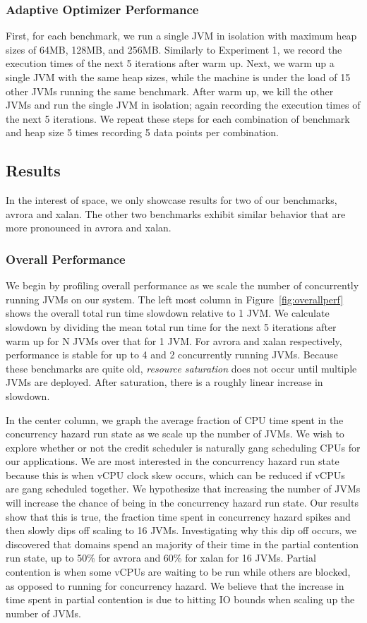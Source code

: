 \documentclass{sig-alternate}
\begin{document}
\subsubsection{Adaptive Optimizer Performance}
First, for each benchmark, we run a single JVM in isolation with maximum heap sizes of 64MB, 128MB, and 256MB. Similarly to Experiment 1, we record the execution times of the next 5 iterations after warm up. Next, we warm up a single JVM with the same heap sizes, while the machine is under the load of 15 other JVMs running the same benchmark. After warm up, we kill the other JVMs and run the single JVM in isolation; again recording the execution times of the next 5 iterations. We repeat these steps for each combination of benchmark and heap size 5 times recording 5 data points per combination.

\subsection{Results}
In the interest of space, we only showcase results for two of our benchmarks, avrora and xalan. The other two benchmarks exhibit similar behavior that are more pronounced in avrora and xalan.

\subsubsection{Overall Performance}
We begin by profiling overall performance as we scale the number of concurrently running JVMs on our system. The left most column in Figure~\ref{fig:overallperf} shows the overall total run time slowdown relative to 1 JVM. We calculate slowdown by dividing the mean total run time for the next 5 iterations after warm up for N JVMs over that for 1 JVM. For avrora and xalan respectively, performance is stable for up to 4 and 2 concurrently running JVMs. Because these benchmarks are quite old, \textit{resource saturation} does not occur until multiple JVMs are deployed. After saturation, there is a roughly linear increase in slowdown.

In the center column, we graph the average fraction of CPU time spent in the concurrency hazard run state as we scale up the number of JVMs. We wish to explore whether or not the credit scheduler is naturally gang scheduling CPUs for our applications. We are most interested in the concurrency hazard run state because this is when vCPU clock skew occurs, which can be reduced if vCPUs are gang scheduled together. We hypothesize that increasing the number of JVMs will increase the chance of being in the concurrency hazard run state. Our results show that this is true, the fraction time spent in concurrency hazard spikes and then slowly dips off scaling to 16 JVMs. Investigating why this dip off occurs, we discovered that domains spend an majority of their time in the partial contention run state, up to 50\% for avrora and 60\% for xalan for 16 JVMs. Partial contention is when some vCPUs are waiting to be run while others are blocked, as opposed to running for concurrency hazard. We believe that the increase in time spent in partial contention is due to hitting IO bounds when scaling up the number of JVMs.
\end{document}
